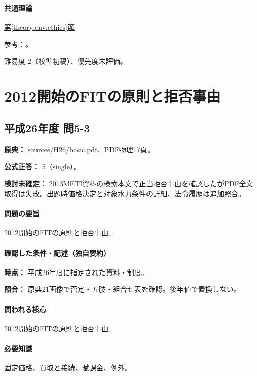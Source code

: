\paragraph{共通理論} \hyperref[theory:env:ethics]{第\ref*{theory:env:ethics}節}

\par 参考：\cite{ipej_ethics2011}。

\par 難易度 2（校準初稿）、優先度未評価。

\section{2012開始のFITの原則と拒否事由}

\subsection{平成26年度 問5-3}
\label{q:h26-reg-basic-5-3}

\noindent\textbf{原典：} sources/H26/basic.pdf、PDF物理17頁。

\textbf{公式正答：} 5（single）。

\par\textbf{検討未確定：} 2013METI資料の検索本文で正当拒否事由を確認したがPDF全文取得は失敗。出題時価格決定と対象水力条件の詳細、法令履歴は追加照合。

\paragraph{問題の要旨} 2012開始のFITの原則と拒否事由。

\paragraph{確認した条件・記述（独自要約）}\mbox{}\par

\noindent\textbf{時点：} 平成26年度に指定された資料・制度。\par

\noindent\textbf{照合：} 原典21画像で否定・五肢・組合せ表を確認。後年値で置換しない。\par

\paragraph{問われる核心} 2012開始のFITの原則と拒否事由。

\paragraph{必要知識} 固定価格、買取と接続、賦課金、例外。

